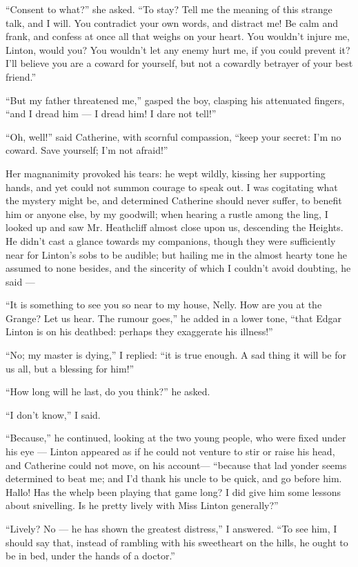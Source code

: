 \par “Consent to what?” she asked. “To stay? Tell me the meaning of this strange talk, and I will. You contradict your own words, and distract me! Be calm and frank, and confess at once all that weighs on your heart. You wouldn't injure me, Linton, would you? You wouldn't let any enemy hurt me, if you could prevent it? I'll believe you are a coward for yourself, but not a cowardly betrayer of your best friend.”
\par “But my father threatened me,” gasped the boy, clasping his attenuated fingers, “and I dread him — I dread him! I dare not tell!”
\par “Oh, well!” said Catherine, with scornful compassion, “keep your secret: I'm no coward. Save yourself; I'm not afraid!”
\par Her magnanimity provoked his tears: he wept wildly, kissing her supporting hands, and yet could not summon courage to speak out. I was cogitating what the mystery might be, and determined Catherine should never suffer, to benefit him or anyone else, by my goodwill; when hearing a rustle among the ling, I looked up and saw Mr. Heathcliff almost close upon us, descending the Heights. He didn't cast a glance towards my companions, though they were sufficiently near for Linton's sobs to be audible; but hailing me in the almost hearty tone he assumed to none besides, and the sincerity of which I couldn't avoid doubting, he said —
\par “It is something to see you so near to my house, Nelly. How are you at the Grange? Let us hear. The rumour goes,” he added in a lower tone, “that Edgar Linton is on his deathbed: perhaps they exaggerate his illness!”
\par “No; my master is dying,” I replied: “it is true enough. A sad thing it will be for us all, but a blessing for him!”
\par “How long will he last, do you think?” he asked.
\par “I don't know,” I said.
\par “Because,” he continued, looking at the two young people, who were fixed under his eye — Linton appeared as if he could not venture to stir or raise his head, and Catherine could not move, on his account— “because that lad yonder seems determined to beat me; and I'd thank his uncle to be quick, and go before him. Hallo! Has the whelp been playing that game long? I did give him some lessons about snivelling. Is he pretty lively with Miss Linton generally?”
\par “Lively? No — he has shown the greatest distress,” I answered. “To see him, I should say that, instead of rambling with his sweetheart on the hills, he ought to be in bed, under the hands of a doctor.”
